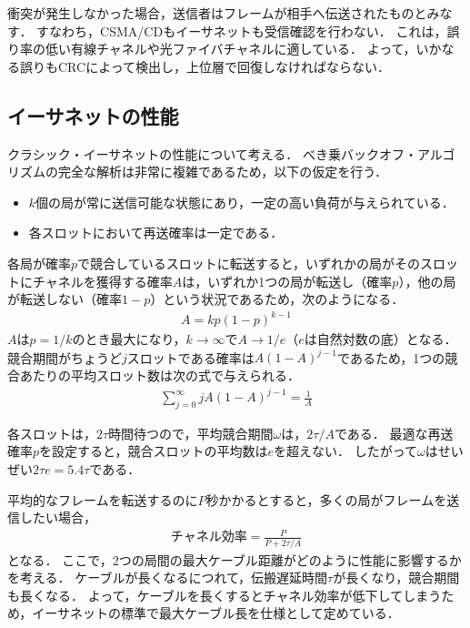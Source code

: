 \documentclass[a4paper]{ltjsarticle}
\begin{document}
衝突が発生しなかった場合，送信者はフレームが相手へ伝送されたものとみなす．
すなわち，CSMA/CDもイーサネットも受信確認を行わない．
これは，誤り率の低い有線チャネルや光ファイバチャネルに適している．
よって，いかなる誤りもCRCによって検出し，上位層で回復しなければならない．

\subsection{イーサネットの性能}\label{ux30a4ux30fcux30b5ux30cdux30c3ux30c8ux306eux6027ux80fd}

クラシック・イーサネットの性能について考える．
べき乗バックオフ・アルゴリズムの完全な解析は非常に複雑であるため，以下の仮定を行う．

\begin{itemize}
\item
  \(k\)個の局が常に送信可能な状態にあり，一定の高い負荷が与えられている．
\item
  各スロットにおいて再送確率は一定である．
\end{itemize}

各局が確率\(p\)で競合しているスロットに転送すると，いずれかの局がそのスロットにチャネルを獲得する確率\(A\)は，いずれか1つの局が転送し（確率\(p\)），他の局が転送しない（確率\(1-p\)）という状況であるため，次のようになる．
\begin{align}
  A = kp(1-p)^{k-1}
\end{align}
\(A\)は\(p=1/k\)のとき最大になり，\(k \to \infty\)で\(A \to 1/e\)（\(e\)は自然対数の底）となる．
競合期間がちょうど\(j\)スロットである確率は\(A(1-A)^{j-1}\)であるため，1つの競合あたりの平均スロット数は次の式で与えられる．
\begin{align}
  \sum^{\infty}_{j=0} jA(1-A)^{j-1} = \frac{1}{A}
\end{align}

各スロットは，\(2 \tau\)時間待つので，平均競合期間\(\omega\)は，\(2 \tau / A\)である．
最適な再送確率\(p\)を設定すると，競合スロットの平均数は\(e\)を超えない．
したがって\(\omega\)はせいぜい\(2 \tau e = 5.4 \tau\)である．

平均的なフレームを転送するのに\(P\)秒かかるとすると，多くの局がフレームを送信したい場合，
\begin{align}
  \text{チャネル効率} = \frac{P}{P + 2 \tau / A}
\end{align}
となる．
ここで，2つの局間の最大ケーブル距離がどのように性能に影響するかを考える．
ケーブルが長くなるにつれて，伝搬遅延時間\(\tau\)が長くなり，競合期間も長くなる．
よって，ケーブルを長くするとチャネル効率が低下してしまうため，イーサネットの標準で最大ケーブル長を仕様として定めている．
\end{document}
